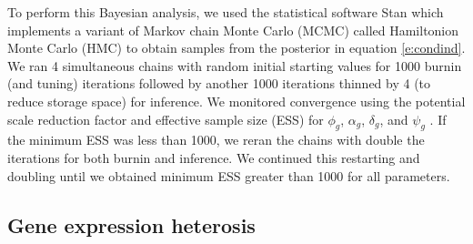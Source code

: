 \documentclass[useAMS,usenatbib,referee]{biom}
\newcommand{\Stan}{Stan}
\begin{document}
To perform this Bayesian analysis, we used the statistical software \Stan{} which implements a variant of Markov chain Monte Carlo (MCMC) called Hamiltonion Monte Carlo (HMC) \citep{neal2011mcmc} to obtain samples from the posterior in equation \eqref{e:condind}. We ran 4 simultaneous chains with random initial starting values for 1000 burnin (and tuning) iterations followed by another 1000 iterations thinned by 4 (to reduce storage space) for inference. We monitored convergence using the potential scale reduction factor and effective sample size (ESS) for $\phi_g$, $\alpha_g$, $\delta_g$, and $\psi_g$ \citep{Gelm:Rubi:infe:1992}. If the minimum ESS was less than 1000, we reran the chains with double the iterations for both burnin and inference. We continued this restarting and doubling until we obtained minimum ESS greater than 1000 for all parameters.

\subsection{Gene expression heterosis}
\label{s:gene_heterosis}
\end{document}
